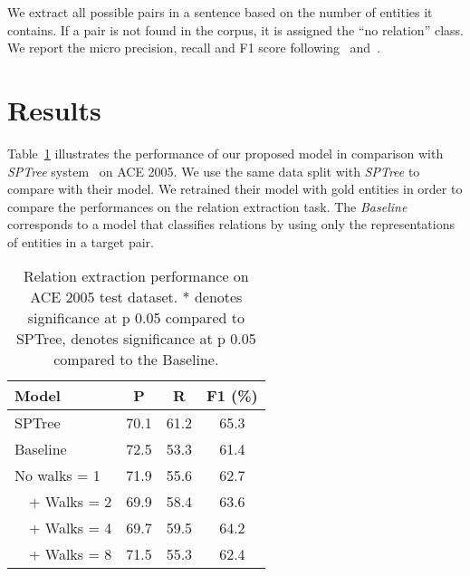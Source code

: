 \documentclass[11pt,a4paper]{article}
\begin{document}
    We extract all possible pairs in a sentence based on the number of entities it contains. 
    If a pair is not found in the corpus, it is assigned the ``no relation'' class. 	
    We report the micro precision, recall and F1 score following~\citet{miwa2016end} and~\citet{nguyen2015perspective}.

\section{Results}
     
	Table~\ref{tab:res} illustrates the performance of our proposed model in comparison with \textit{SPTree} system~\citet{miwa2016end} on ACE 2005.  
    We use the same data split with \textit{SPTree} to compare with their model. We retrained their model with gold entities in order to compare the performances on the relation extraction task. 
    The \textit{Baseline} corresponds to a model that classifies relations by using only the representations of entities in a target pair.
     
	\begin{table}[t!]
		\centering
		\renewcommand*{\arraystretch}{1.1}
		\begin{tabular}{|lccc|}
			\hline
			Model & P & R & F1 (\%) \\
			\hline \hline 
			SPTree				    & 70.1 & 61.2 & 65.3  \\
			\hline
			Baseline  			    & 72.5 & 53.3 & 61.4\rlap{}  \\
			No walks  = 1	    & 71.9 & 55.6 & 62.7  \\
			\ \ + Walks  = 2	    & 69.9 & 58.4 & 63.6\rlap{}  \\
			\ \ + Walks  = 4 	& 69.7 & 59.5 & 64.2\rlap{}  \\
            \ \ + Walks  = 8 	& 71.5 & 55.3 & 62.4  \\
			\hline
		\end{tabular}
		\caption{Relation extraction performance on ACE 2005 test dataset. * denotes significance at p  0.05 compared to SPTree,  denotes significance at p  0.05 compared to the Baseline. } 
        \label{tab:res}
	\end{table}
    
\end{document}
